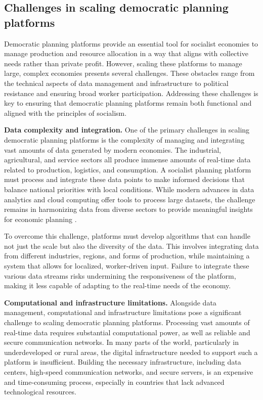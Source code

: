 \begin{refsection}
\subsection{Challenges in scaling democratic planning platforms}

Democratic planning platforms provide an essential tool for socialist economies to manage production and resource allocation in a way that aligns with collective needs rather than private profit. However, scaling these platforms to manage large, complex economies presents several challenges. These obstacles range from the technical aspects of data management and infrastructure to political resistance and ensuring broad worker participation. Addressing these challenges is key to ensuring that democratic planning platforms remain both functional and aligned with the principles of socialism.

\textbf{Data complexity and integration.} One of the primary challenges in scaling democratic planning platforms is the complexity of managing and integrating vast amounts of data generated by modern economies. The industrial, agricultural, and service sectors all produce immense amounts of real-time data related to production, logistics, and consumption. A socialist planning platform must process and integrate these data points to make informed decisions that balance national priorities with local conditions. While modern advances in data analytics and cloud computing offer tools to process large datasets, the challenge remains in harmonizing data from diverse sectors to provide meaningful insights for economic planning \cite[pp.~99]{medina2014cybersyn}.

To overcome this challenge, platforms must develop algorithms that can handle not just the scale but also the diversity of the data. This involves integrating data from different industries, regions, and forms of production, while maintaining a system that allows for localized, worker-driven input. Failure to integrate these various data streams risks undermining the responsiveness of the platform, making it less capable of adapting to the real-time needs of the economy.

\textbf{Computational and infrastructure limitations.} Alongside data management, computational and infrastructure limitations pose a significant challenge to scaling democratic planning platforms. Processing vast amounts of real-time data requires substantial computational power, as well as reliable and secure communication networks. In many parts of the world, particularly in underdeveloped or rural areas, the digital infrastructure needed to support such a platform is insufficient. Building the necessary infrastructure, including data centers, high-speed communication networks, and secure servers, is an expensive and time-consuming process, especially in countries that lack advanced technological resources.


\end{refsection}
